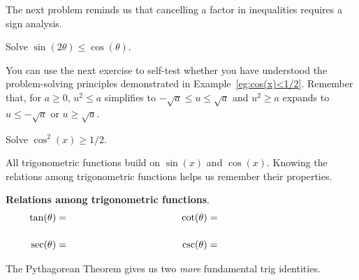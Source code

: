 \documentclass[../main.tex]{subfiles}
\begin{document}
The next problem reminds us that cancelling a factor in inequalities requires a sign analysis.
\begin{example}
  Solve \(\sin(2\theta) \le \cos(\theta)\).

  \blanks*
\end{example}
\clearpage

You can use the next exercise to self-test whether you have understood the problem-solving principles demonstrated in Example~\ref{eg:cos(x)<1/2}. Remember that, for \(a \ge 0\), \(u^{2} \le a\) simplifies to \(-\sqrt{a} \le u \le \sqrt{a}\) and \(u^{2} \ge a\) expands to \(u \le -\sqrt{a}\) or \(u \ge \sqrt{a}\).
\begin{exercise}
  Solve \(\cos^{2}(x) \ge 1/2\).

  \blanks*
\end{exercise}
\clearpage

All trigonometric functions build on \(\sin(x)\) and \(\cos(x)\).  Knowing the relations among trigonometric functions helps us remember their properties.

\begin{mdframed}[style=simple-compact]
  \textbf{Relations among trigonometric functions}.
  \begin{align}
    \tan(\theta) &= \hspace{1.5in} & \cot(\theta) &= \hspace{1.5in}& \\[3ex]
    \sec(\theta) &= \hspace{1.5in} & \csc(\theta) &= \hspace{1.5in}&
  \end{align}

  The Pythagorean Theorem gives us two \emph{more} fundamental trig identities.
  \vspace{1.5in}
\end{mdframed}
\end{document}
